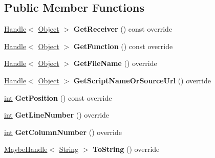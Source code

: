 \subsection*{Public Member Functions}
\begin{DoxyCompactItemize}
\item 
\mbox{\label{classv8_1_1internal_1_1AsmJsWasmStackFrame_a8b662955482dcc335fba96ffc3b7025c}} 
\mbox{\hyperlink{classv8_1_1internal_1_1Handle}{Handle}}$<$ \mbox{\hyperlink{classv8_1_1internal_1_1Object}{Object}} $>$ {\bfseries Get\+Receiver} () const override
\item 
\mbox{\label{classv8_1_1internal_1_1AsmJsWasmStackFrame_af4e590a4339c8d643a318eef97e28a50}} 
\mbox{\hyperlink{classv8_1_1internal_1_1Handle}{Handle}}$<$ \mbox{\hyperlink{classv8_1_1internal_1_1Object}{Object}} $>$ {\bfseries Get\+Function} () const override
\item 
\mbox{\label{classv8_1_1internal_1_1AsmJsWasmStackFrame_ab390f1ab816c8ba309c30c791582464a}} 
\mbox{\hyperlink{classv8_1_1internal_1_1Handle}{Handle}}$<$ \mbox{\hyperlink{classv8_1_1internal_1_1Object}{Object}} $>$ {\bfseries Get\+File\+Name} () override
\item 
\mbox{\label{classv8_1_1internal_1_1AsmJsWasmStackFrame_a7734ad0e9743adfc7056127b86af8008}} 
\mbox{\hyperlink{classv8_1_1internal_1_1Handle}{Handle}}$<$ \mbox{\hyperlink{classv8_1_1internal_1_1Object}{Object}} $>$ {\bfseries Get\+Script\+Name\+Or\+Source\+Url} () override
\item 
\mbox{\label{classv8_1_1internal_1_1AsmJsWasmStackFrame_a03adf6002ac4c9929aa9746e18b4a101}} 
\mbox{\hyperlink{classint}{int}} {\bfseries Get\+Position} () const override
\item 
\mbox{\label{classv8_1_1internal_1_1AsmJsWasmStackFrame_aec58827a995c12206e809a666a49fd56}} 
\mbox{\hyperlink{classint}{int}} {\bfseries Get\+Line\+Number} () override
\item 
\mbox{\label{classv8_1_1internal_1_1AsmJsWasmStackFrame_a0d5067e353ef320da5706485313c4eb6}} 
\mbox{\hyperlink{classint}{int}} {\bfseries Get\+Column\+Number} () override
\item 
\mbox{\label{classv8_1_1internal_1_1AsmJsWasmStackFrame_ac2dc46ccd1be7fcef12d2c2af9582628}} 
\mbox{\hyperlink{classv8_1_1internal_1_1MaybeHandle}{Maybe\+Handle}}$<$ \mbox{\hyperlink{classv8_1_1internal_1_1String}{String}} $>$ {\bfseries To\+String} () override
\end{DoxyCompactItemize}
